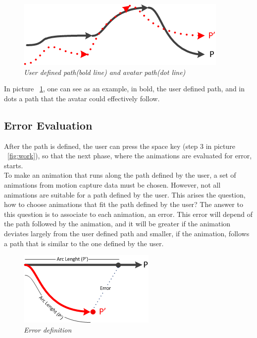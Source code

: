 \documentclass[a4paper]{article}
\begin{document}
\begin{figure}[hbtp]
\begin{center}
\includegraphics[scale=0.8]{Images/UserPathVSAvatarPath.png} 
\caption{\textit{User defined path(bold line) and avatar path(dot line)}}
\label{fig:uapath}
\end{center}
\end{figure}

In picture ~\ref{fig:uapath}, one can see as an example, in bold, the user defined path, and in dots a path that the avatar could effectively follow.  \\





\subsection{Error Evaluation}
After the path is defined, the user can press the space key (step 3 in picture ~\ref{fig:work}), so that the next phase, where the animations are evaluated for error, starts. \\

To make an animation that runs along the path defined by the user, a set of animations from motion capture data must be chosen.  However, not all animations are suitable for a path defined by the user. This arises the question, how to choose animations that fit the path defined by the user? The answer to this question is to associate to each animation, an error. This error will depend of the path followed by the animation, and it will be greater if the animation deviates largely from the user defined path and smaller, if the animation, follows a path that is similar to the one defined by the user.  \\

\begin{figure}[hbtp]
\begin{center}
\includegraphics[scale=0.8]{Images/error.png} 
\caption{\textit{Error definition}}
\label{fig:error}
\end{center}
\end{figure}
\end{document}
